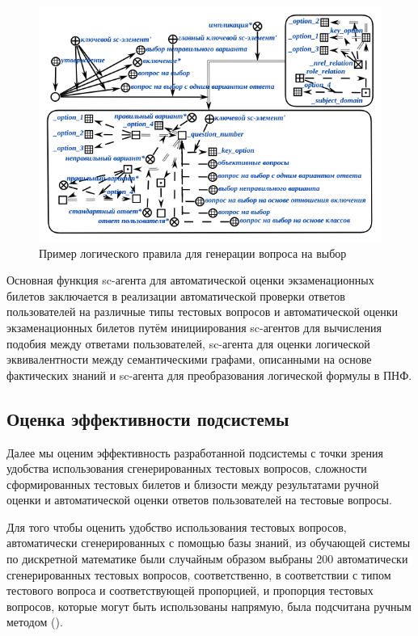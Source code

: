 \begin{figure}[H]
	\includegraphics[scale=1]{author/part7/figures/logic_rule_example.png}
	\caption{Пример логического правила для генерации вопроса на выбор}
	\label{fig:LRE_example}
\end{figure}

Основная функция sc-агента для автоматической оценки экзаменационных билетов заключается в реализации автоматической проверки ответов пользователей на различные типы тестовых вопросов и автоматической оценки экзаменационных билетов путём инициирования sc-агентов для вычисления подобия между ответами пользователей, sc-агента для оценки логической эквивалентности между семантическими графами, описанными на основе фактических знаний и sc-агента для преобразования логической формулы в ПНФ.

\subsection{Оценка эффективности подсистемы}

Далее мы оценим эффективность разработанной подсистемы с точки зрения удобства использования сгенерированных тестовых вопросов, сложности сформированных тестовых билетов и близости между результатами ручной оценки и автоматической оценки ответов пользователей на тестовые вопросы.

Для того чтобы оценить удобство использования тестовых вопросов, автоматически сгенерированных с помощью базы знаний, из обучающей системы по дискретной математике были случайным образом выбраны 200 автоматически сгенерированных тестовых вопросов, соответственно, в соответствии с типом тестового вопроса и соответствующей пропорцией, и пропорция тестовых вопросов, которые могут быть использованы напрямую, была подсчитана ручным методом (\textit{}).

